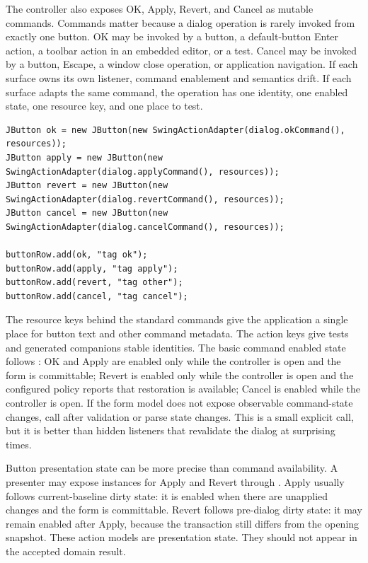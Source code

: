 The controller also exposes OK, Apply, Revert, and Cancel as mutable commands. Commands
matter because a dialog operation is rarely invoked from exactly one button.
OK may be invoked by a button, a default-button Enter action, a toolbar action
in an embedded editor, or a test. Cancel may be invoked by a button, Escape, a
window close operation, or application navigation. If each surface owns its own
listener, command enablement and semantics drift. If each surface adapts the
same command, the operation has one identity, one enabled state, one resource
key, and one place to test.

\begin{lstlisting}[caption={Dialog buttons adapt dialog commands.}]
JButton ok = new JButton(new SwingActionAdapter(dialog.okCommand(), resources));
JButton apply = new JButton(new SwingActionAdapter(dialog.applyCommand(), resources));
JButton revert = new JButton(new SwingActionAdapter(dialog.revertCommand(), resources));
JButton cancel = new JButton(new SwingActionAdapter(dialog.cancelCommand(), resources));

buttonRow.add(ok, "tag ok");
buttonRow.add(apply, "tag apply");
buttonRow.add(revert, "tag other");
buttonRow.add(cancel, "tag cancel");
\end{lstlisting}

The resource keys behind the standard commands give the application a single
place for button text and other command metadata. The action keys give tests
and generated companions stable identities. The basic command enabled state
follows : OK and Apply are enabled only while the
controller is open and the form is committable; Revert is enabled only while
the controller is open and the configured policy reports that restoration is
available; Cancel is enabled while the controller is open. If the form model
does not expose observable command-state changes, call 
after validation or parse state changes. This is a small explicit call, but it
is better than hidden listeners that revalidate the dialog at surprising times.

Button presentation state can be more precise than command availability. A
presenter may expose  instances for Apply and Revert
through . Apply usually follows current-baseline
dirty state: it is enabled when there are unapplied changes and the form is
committable. Revert follows pre-dialog dirty state: it may remain enabled
after Apply, because the transaction still differs from the opening snapshot.
These action models are presentation state. They should not appear in the
accepted domain result.

